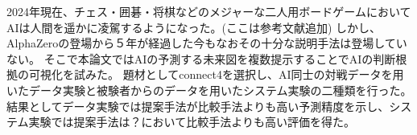\abstract
2024年現在、チェス・囲碁・将棋などのメジャーな二人用ボードゲームにおいてAIは人間を遥かに凌駕するようになった。(ここは参考文献追加)
しかし、AlphaZero\cite{AlphaZero}の登場から５年が経過した今もなおその十分な説明手法は登場していない。
そこで本論文ではAIの予測する未来図を複数提示することでAIの判断根拠の可視化を試みた。
題材としてconnect4を選択し、AI同士の対戦データを用いたデータ実験と被験者からのデータを用いたシステム実験の二種類を行った。
結果としてデータ実験では提案手法が比較手法よりも高い予測精度を示し、システム実験では提案手法は？において比較手法よりも高い評価を得た。